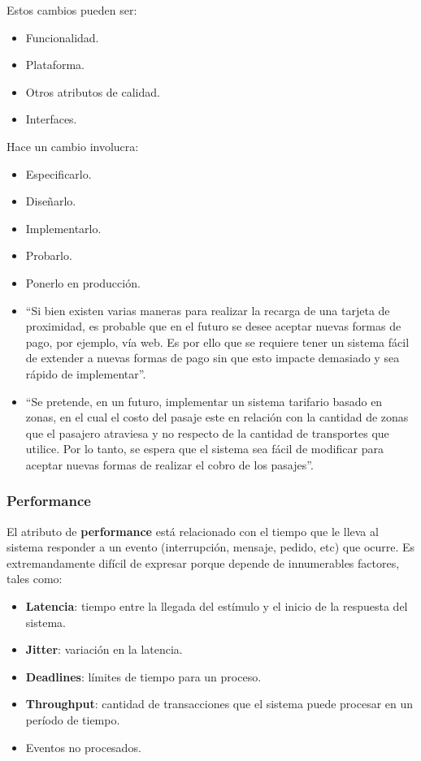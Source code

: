 \documentclass[]{article}
\begin{document}
Estos cambios pueden ser:
\begin{itemize}
	\item Funcionalidad.
	\item Plataforma.
	\item Otros atributos de calidad.
	\item Interfaces.
\end{itemize}

Hace un cambio involucra:
\begin{itemize}
	\item Especificarlo.
	\item Diseñarlo.
	\item Implementarlo.
	\item Probarlo.
	\item Ponerlo en producción.
\end{itemize}


\begin{itemize}
	\item ``Si bien existen varias maneras para realizar la recarga de una tarjeta de proximidad, es probable que en el futuro se desee aceptar nuevas formas de pago, por ejemplo, vía web. Es por ello que se requiere tener un sistema fácil de extender a nuevas formas de pago sin que esto impacte demasiado y sea rápido de implementar''.
	\item ``Se pretende, en un futuro, implementar un sistema tarifario basado en zonas, en el cual el costo del pasaje este en relación con la cantidad de zonas que el pasajero atraviesa y no respecto de la cantidad de transportes que utilice. Por lo tanto, se espera que el sistema sea fácil de modificar para aceptar nuevas formas de realizar el cobro de los pasajes''.
\end{itemize}

\subsubsection{Performance}
El atributo de \textbf{performance} está relacionado con el tiempo que le lleva al sistema responder a un evento (interrupción, mensaje, pedido, etc) que ocurre. Es extremandamente difícil de expresar porque depende de innumerables factores, tales como:
\begin{itemize}
 	\item \textbf{Latencia}: tiempo entre la llegada del estímulo y el inicio de la respuesta del sistema.
	\item \textbf{Jitter}: variación en la latencia.
	\item \textbf{Deadlines}: límites de tiempo para un proceso.
	\item \textbf{Throughput}: cantidad de transacciones que el sistema puede procesar en un período de tiempo.
	\item Eventos no procesados.
\end{itemize}
\end{document}
